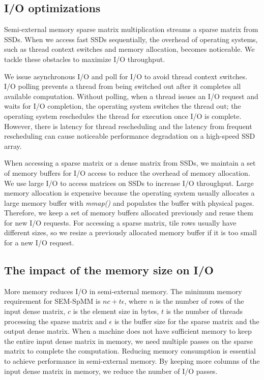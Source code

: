 \subsection{I/O optimizations}
Semi-external memory sparse matrix multiplication streams a sparse matrix from
SSDs. When we access fast SSDs sequentially, the overhead of operating systems,
such as thread context switches and memory allocation, becomes noticeable.
We tackle these obstacles to maximize I/O throughput.

We issue asynchronous I/O and poll for I/O to avoid thread
context switches.
I/O polling prevents a thread from being switched out after it completes all available computation.
Without polling, when a thread issues an I/O request and waits for I/O completion,
the operating system switches the thread
out; the operating system reschedules the thread for execution once I/O is
complete. However, there is latency for thread rescheduling and the latency
from frequent rescheduling can cause noticeable performance degradation
on a high-speed SSD array.

When accessing a sparse matrix or a dense matrix from SSDs, we maintain a set of
memory buffers for I/O access to reduce the overhead of memory allocation.
We use large I/O to access matrices on SSDs to increase I/O throughput.
Large memory allocation is expensive because the operating
system usually allocates a large memory buffer with \textit{mmap()} and
populates the buffer with physical pages. Therefore, we keep
a set of memory buffers allocated previously and reuse them for new I/O requests.
For accessing a sparse matrix, tile rows usually have different sizes, so we resize
a previously allocated memory buffer if it is too small for a new I/O request.

\subsection{The impact of the memory size on I/O}
\label{sec:spmm:mem}
More memory reduces I/O in semi-external memory. The minimum memory requirement
for SEM-SpMM is $n c + t \epsilon$, where $n$ is the number of rows
of the input dense matrix, $c$ is the element size in bytes,
$t$ is the number of threads processing the sparse matrix
and $\epsilon$ is the buffer size for the sparse matrix and the output
dense matrix. When a machine does not have sufficient memory to keep the entire
input dense matrix in memory, we need multiple passes on the sparse matrix to
complete the computation. Reducing memory consumption is essential
to achieve performance in semi-external memory. By keeping more columns of
the input dense matrix in memory, we reduce the number of I/O passes.

